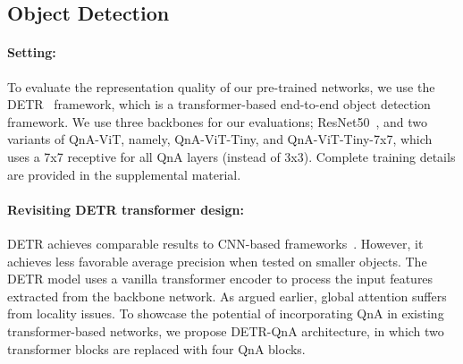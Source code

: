 \subsection{Object Detection}
\begin{table}
\caption{\textbf{DETR~\cite{DETR} Based Object detection on the COCO Dataset~\cite{COCO}}. Incorporating QnA-ViT-Tiny with DETR substantially improves upon the ResNet50 backbone (by up to 3.2). QnA with receptive field 7x7 improves the average precision on large objects (), and incorporating QnA into the DETR network improves performance on smaller objects, indicating locality. }
\label{tbl:detr}
\end{table} 
\paragraph{Setting:} To evaluate the representation quality of our pre-trained networks, we use the DETR~\cite{DETR} framework, which is a transformer-based end-to-end object detection framework. We use three backbones for our evaluations; ResNet50~\cite{ResNet}, and two variants of QnA-ViT, namely, QnA-ViT-Tiny, and QnA-ViT-Tiny-7x7, which uses a 7x7 receptive for all QnA layers (instead of 3x3). Complete training details are provided in the supplemental material.


\paragraph{Revisiting DETR transformer design: } 
DETR achieves comparable results to CNN-based frameworks~\cite{FastRCNN}. However, it achieves less favorable average precision when tested on smaller objects. The DETR model uses a vanilla transformer encoder to process the input features extracted from the backbone network. As argued earlier, global attention suffers from locality issues. To showcase the potential of incorporating QnA in existing transformer-based networks, we propose DETR-QnA architecture, in which two transformer blocks are replaced with four QnA blocks.

